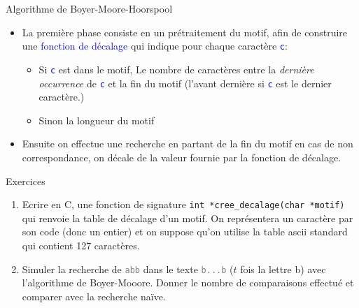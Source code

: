 \documentclass[10pt]{beamer}
\begin{document}
\begin{frame}{\Ctitle}{\stitle}
	\begin{block}{Algorithme de Boyer-Moore-Hoorspool}
		\begin{itemize}
			\item<1-> La première phase consiste en un prétraitement du motif, afin de construire une \textcolor{blue}{fonction de décalage} qui indique pour chaque caractère \textcolor{blue}{\tt c}:
				\begin{itemize}
					\item<2-> Si \textcolor{blue}{\tt c} est dans le motif, Le nombre de caractères entre la \textit{dernière occurrence} de \textcolor{blue}{\tt c} et la fin du motif (l'avant dernière si \textcolor{blue}{\tt c} est le dernier caractère.)
					\item<3-> Sinon la longueur du motif
				\end{itemize}
			\item<4-> Ensuite on effectue une recherche en partant de la fin du motif en cas de non correspondance, on décale de la valeur fournie par la fonction de décalage.
		\end{itemize}
	\end{block}
\end{frame}

\begin{frame}{\Ctitle}{\stitle}
	\begin{exampleblock}{Exercices}
		\begin{enumerate}
			\item Ecrire en C, une fonction de signature \texttt{int *cree_decalage(char *motif)} qui renvoie la table de décalage d'un motif. On représentera un caractère par son code (donc un entier) et on suppose qu'on utilise la table {\sc ascii} standard qui contient 127 caractères.
			\item Simuler la recherche de \textcolor{gray}{\tt abb} dans le texte \textcolor{gray}{\tt b...b} ($t$ fois la lettre b) avec l'algorithme de Boyer-Mooore. Donner le nombre de comparaisons effectué et comparer avec la recherche naïve.
		\end{enumerate}
	\end{exampleblock}
\end{frame}
\end{document}
